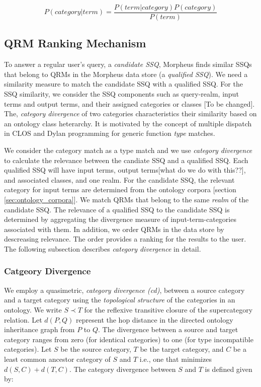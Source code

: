 \begin{equation}
\label{eq:bayesrule}
P (category | term) = \frac{P(term | category) P(category)}{P(term)}
\end{equation}    



\subsection{QRM Ranking Mechanism} 
\label{sec:qrm_ranking}

To answer a regular user's query, a \textit{candidate
SSQ}, Morpheus finds similar SSQs that belong to QRMs in the Morpheus data store (a \textit{qualified SSQ}). We need a similarity measure to match the candidate SSQ
with a qualified SSQ. For the SSQ similarity, we
consider the SSQ components such as query-realm, input
terms and output terms, and their assigned categories or classes [To be changed]. The,
\textit{category divergence} of two categories characteristics their 
similarity based on an ontology class heterarchy. 
It is motivated by the concept of multiple
dispatch in CLOS and Dylan programming for generic function \emph{type} matches. 

We consider the category match as a type match and we use 
\emph{category divergence} to calculate the relevance between 
the candiate SSQ and a qualified SSQ. Each qualified SSQ will 
have input terms, output terms[what do we do with this??], and associated classes, and one realm. 
For the candidate SSQ, the relevant category for input terms 
are determined from the ontology corpora [section \ref{sec:ontology_corpora}]. We match QRMs that belong to the same \emph{realm} of the candidate SSQ. The relevance of a qualified SSQ to the candidate SSQ is 
determined by aggregating the divergence measure of input-term-categories 
associated with them. In addition, we order QRMs in the data store 
by descreasing relevance. The order provides a ranking for the results 
to the user. The following subsection describes \emph{category divergence} 
in detail.

\subsubsection{Catgeory Divergence}
\label{sec:ctd}

We employ a quasimetric, \textit{category
divergence (cd)},
between a source category and a target category using the \textit{topological
structure} of the categories in an ontology. We write $S \prec T$ for the
reflexive
transitive closure of the supercategory relation. Let $d(P,Q)$ represent the hop
distance in the directed ontology inheritance graph from $P$ to $Q$. The
divergence between a source and target category ranges from zero (for identical
categories) to one (for type incompatible categories). Let $S$ be the source
category, $T$ be
the target category, and $C$ be a least common ancestor category of $S$ and
$T$ i.e., one that minimizes $d(S,C) + d(T,C)$. The category divergence between $S$ and $T$ is defined given by:


